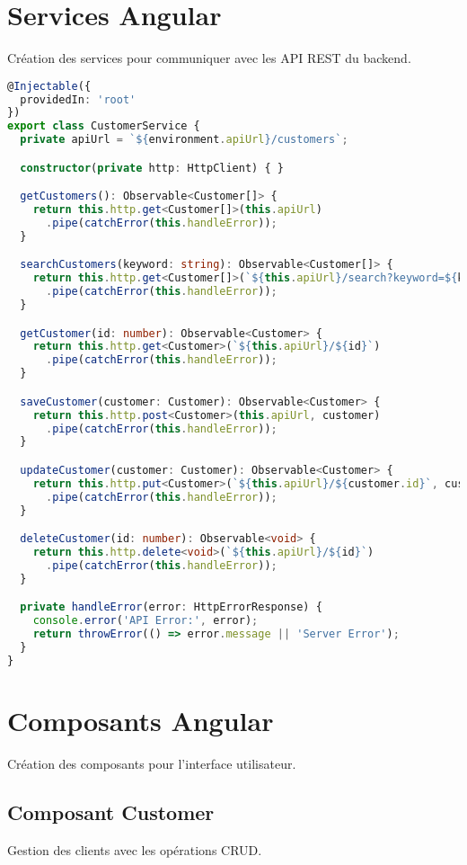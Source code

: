 \documentclass[12pt,a4paper]{report}
\begin{document}
\section{Services Angular}
Création des services pour communiquer avec les API REST du backend.

\begin{lstlisting}[language=TypeScript, caption=customer.service.ts]
@Injectable({
  providedIn: 'root'
})
export class CustomerService {
  private apiUrl = `${environment.apiUrl}/customers`;

  constructor(private http: HttpClient) { }

  getCustomers(): Observable<Customer[]> {
    return this.http.get<Customer[]>(this.apiUrl)
      .pipe(catchError(this.handleError));
  }

  searchCustomers(keyword: string): Observable<Customer[]> {
    return this.http.get<Customer[]>(`${this.apiUrl}/search?keyword=${keyword}`)
      .pipe(catchError(this.handleError));
  }

  getCustomer(id: number): Observable<Customer> {
    return this.http.get<Customer>(`${this.apiUrl}/${id}`)
      .pipe(catchError(this.handleError));
  }

  saveCustomer(customer: Customer): Observable<Customer> {
    return this.http.post<Customer>(this.apiUrl, customer)
      .pipe(catchError(this.handleError));
  }

  updateCustomer(customer: Customer): Observable<Customer> {
    return this.http.put<Customer>(`${this.apiUrl}/${customer.id}`, customer)
      .pipe(catchError(this.handleError));
  }

  deleteCustomer(id: number): Observable<void> {
    return this.http.delete<void>(`${this.apiUrl}/${id}`)
      .pipe(catchError(this.handleError));
  }

  private handleError(error: HttpErrorResponse) {
    console.error('API Error:', error);
    return throwError(() => error.message || 'Server Error');
  }
}
\end{lstlisting}

\section{Composants Angular}
Création des composants pour l'interface utilisateur.

\subsection{Composant Customer}
Gestion des clients avec les opérations CRUD.
\end{document}
